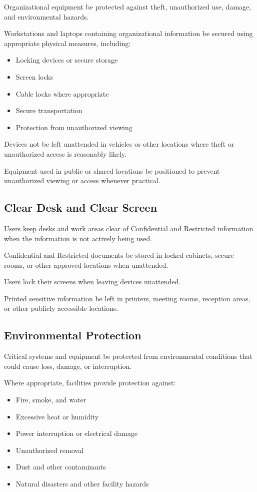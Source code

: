 Organizational equipment \must{} be protected against theft, unauthorized use, damage, and environmental hazards.

Workstations and laptops containing organizational information \should{} be secured using appropriate physical measures, including:
\begin{itemize}
    \item Locking devices or secure storage
    \item Screen locks
    \item Cable locks where appropriate
    \item Secure transportation
    \item Protection from unauthorized viewing
\end{itemize}

Devices \must{} not be left unattended in vehicles or other locations where theft or unauthorized access is reasonably likely.

Equipment used in public or shared locations \must{} be positioned to prevent unauthorized viewing or access whenever practical.

\subsection{Clear Desk and Clear Screen}

Users \should{} keep desks and work areas clear of Confidential and Restricted information when the information is not actively being used.

Confidential and Restricted documents \must{} be stored in locked cabinets, secure rooms, or other approved locations when unattended.

Users \must{} lock their screens when leaving devices unattended.

Printed sensitive information \mustnot{} be left in printers, meeting rooms, reception areas, or other publicly accessible locations.

\subsection{Environmental Protection}

Critical systems and equipment \must{} be protected from environmental conditions that could cause loss, damage, or interruption.

Where appropriate, facilities \should{} provide protection against:
\begin{itemize}
    \item Fire, smoke, and water
    \item Excessive heat or humidity
    \item Power interruption or electrical damage
    \item Unauthorized removal
    \item Dust and other contaminants
    \item Natural disasters and other facility hazards
\end{itemize}

